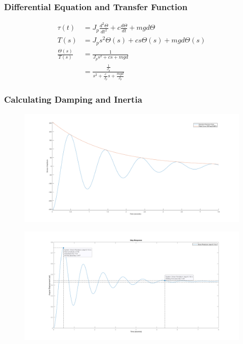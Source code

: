 \documentclass[a4paper,11pt]{article}
\begin{document}
\subsubsection{Differential Equation and Transfer Function}
\begin{align*}
\tau(t) &= J_{p}\frac{d^{2}\Theta}{dt^{2}} + c\frac{d\Theta}{dt} + mgd\Theta \\
T(s) &= J_{p}s^{2}\Theta(s) + cs\Theta(s) + mgd\Theta(s) \\
\frac{\Theta(s)}{T(s)} &= \frac{1}{J_{p}s^{2} + cs + mgd} \\
&=  \frac{\frac{1}{J_{p}}}{s^{2} + \frac{c}{J_{p}}s + \frac{mgd}{J_{p}}}
\end{align*}

\subsubsection{Calculating Damping and Inertia}

\begin{figure}[h]
        \centering
        \includegraphics[width=\textwidth]{inc/fittedcurve.png}
        \caption{}
        \label{}
\end{figure}

\begin{figure}[h]
        \centering
        \includegraphics[width=\textwidth]{inc/pendulum.png}
        \caption{}
        \label{}
\end{figure}
\end{document}
